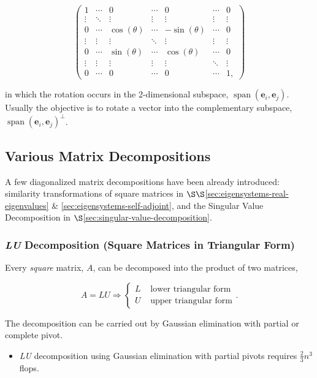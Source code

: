 \documentclass[12pt, twoside, draft]{article}
\begin{document}
\begin{equation}\label{eq:givens_rotation}
\begin{pmatrix}
1 & \cdots & 0 & \cdots & 0 & \cdots & 0 \\
\vdots & \ddots & \vdots & \vdots & \vdots & \vdots & \vdots \\
0 & \cdots & \cos(\theta) & \cdots & -\sin(\theta) & \cdots & 0 \\
\vdots & \vdots & \vdots & \ddots & \vdots & \vdots & \vdots \\
0 & \cdots & \sin(\theta) & \cdots & \cos(\theta) & \cdots & 0 \\
\vdots & \vdots & \vdots & \vdots & \vdots & \ddots & \vdots \\
0 & \cdots & 0 & \cdots & 0 & \cdots & 1 ,
\end{pmatrix}
\end{equation}

in which the rotation occurs in the 2-dimensional subspace, $\operatorname{span}(\mathbf{e}_i, \mathbf{e}_j)$.  Usually the objective is to rotate a vector into the complementary subspace, $\operatorname{span}(\mathbf{e}_i, \mathbf{e}_j)^\perp$.

\subsection{Various Matrix Decompositions}\label{sec:various-matrix-decompositions}
A few diagonalized matrix decompositions have been already introduced: similarity transformations of square matrices in $\S\S$\ref{sec:eigensystems-real-eigenvalues} \& \ref{sec:eigensystems-self-adjoint}, and the Singular Value Decomposition in $\S$\ref{sec:singular-value-decomposition}.
\subsubsection{\textit{LU} Decomposition (Square Matrices in Triangular Form)}\label{sec:LU-decomposition}
Every \textit{square} matrix, $A$, can be decomposed into the product of two matrices, 

\begin{equation}\label{eq:LU_decomposition}
A = LU \Rightarrow \begin{cases} L & \text{ lower triangular form} \\ U & \text{ upper triangular form}   \end{cases} .
\end{equation}

The decomposition can be carried out by Gaussian elimination with partial or complete pivot.
\begin{itemize}
\item \textit{LU} decomposition using Gaussian elimination with partial pivots requires $\frac{2}{3} n^3$ flops.
\end{itemize}
\end{document}
